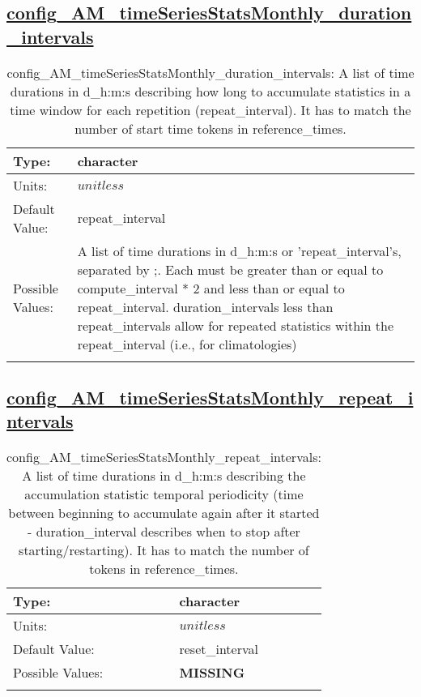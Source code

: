 \subsection[config\_AM\_timeSeriesStatsMonthly\_duration\_intervals]{\hyperref[sec:nm_tab_AM_timeSeriesStatsMonthly]{config\_AM\_timeSeriesStatsMonthly\_duration\_intervals}}
\label{subsec:nm_sec_config_AM_timeSeriesStatsMonthly_duration_intervals}
\begin{center}
\begin{longtable}{| p{2.0in} || p{4.0in} |}
    \hline
    Type: & character \\
    \hline
    Units: & $unitless$ \\
    \hline
    Default Value: & repeat\_interval \\
    \hline
    Possible Values: & A list of time durations in d\_h:m:s or 'repeat\_interval's, separated by ;. Each must be greater than or equal to compute\_interval * 2 and less than or equal to repeat\_interval. duration\_intervals less than repeat\_intervals allow for repeated statistics within the repeat\_interval (i.e., for climatologies) \\
    \hline
    \caption{config\_AM\_timeSeriesStatsMonthly\_duration\_intervals: A list of time durations in d\_h:m:s describing how long to accumulate statistics in a time window for each repetition (repeat\_interval). It has to match the number of start time tokens in reference\_times.}
\end{longtable}
\end{center}
\subsection[config\_AM\_timeSeriesStatsMonthly\_repeat\_intervals]{\hyperref[sec:nm_tab_AM_timeSeriesStatsMonthly]{config\_AM\_timeSeriesStatsMonthly\_repeat\_intervals}}
\label{subsec:nm_sec_config_AM_timeSeriesStatsMonthly_repeat_intervals}
\begin{center}
\begin{longtable}{| p{2.0in} || p{4.0in} |}
    \hline
    Type: & character \\
    \hline
    Units: & $unitless$ \\
    \hline
    Default Value: & reset\_interval \\
    \hline
    Possible Values: & {\bf \color{red} MISSING} \\
    \hline
    \caption{config\_AM\_timeSeriesStatsMonthly\_repeat\_intervals: A list of time durations in d\_h:m:s describing the accumulation statistic temporal periodicity (time between beginning to accumulate again after it started - duration\_interval describes when to stop after starting/restarting). It has to match the number of tokens in reference\_times.}
\end{longtable}
\end{center}
